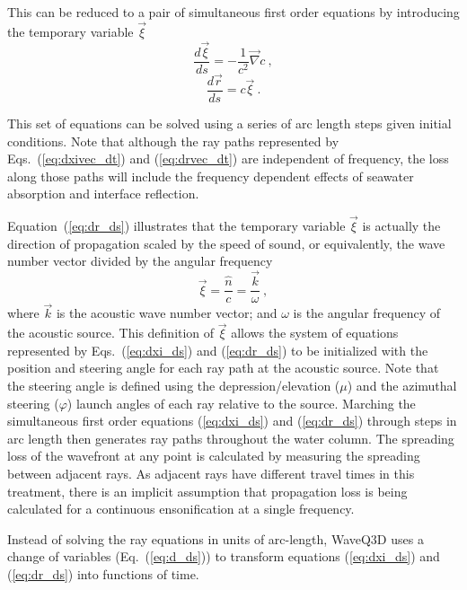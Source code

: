 \documentclass{ws-jca}
\begin{document}
This can be reduced to a pair of simultaneous first order equations by
introducing the temporary variable \(\vec{\xi}\)
\begin{equation}
	\frac{d\vec{\xi}}{ds} = -\frac{1}{c^2} \vec{\nabla}c \:,
	\label{eq:dxi_ds}
\end{equation}
\begin{equation}
	\frac{d\vec{r}}{ds} = c \vec{\xi} \:.
	\label{eq:dr_ds}
\end{equation}

This set of equations can be solved using a series of arc length steps
given initial conditions.\cite{Yakowitz1986,Press1992}
Note that although
the ray paths represented by Eqs.~(\ref{eq:dxivec_dt}) and
(\ref{eq:drvec_dt}) are independent of frequency, the loss along those
paths will include the frequency dependent effects of seawater absorption
and interface reflection.

Equation~(\ref{eq:dr_ds}) illustrates that the temporary variable
\(\vec{\xi}\) is actually the direction of propagation scaled by the speed
of sound, or equivalently, the wave number vector divided by the angular
frequency
\begin{equation}
	\vec{\xi} = \frac{\hat{n}}{c} = \frac{\vec{k}}{\omega} \:,
	\label{eq:n_c}
\end{equation}
where 
\(\vec{k}\) is the acoustic wave number vector; and
\(\omega\) is the angular frequency of the acoustic source.
This definition of \(\vec{\xi}\) allows the system of equations represented
by Eqs.~(\ref{eq:dxi_ds}) and (\ref{eq:dr_ds}) to be initialized with the
position and steering angle for each ray path at the acoustic source.
Note that the steering angle is defined using the depression/elevation (\(\mu\)) and the azimuthal steering (\(\varphi\)) launch angles of each ray relative to the source.  
Marching the simultaneous first order equations (\ref{eq:dxi_ds}) and (\ref{eq:dr_ds}) through steps in arc length then
generates ray paths throughout the water column. The spreading loss of the
wavefront at any point is calculated by measuring the spreading between
adjacent rays. As adjacent rays have different travel times in this
treatment, there is an implicit assumption that propagation loss is being
calculated for a continuous ensonification at a single frequency.

Instead of solving the ray equations in units of arc-length, WaveQ3D uses a change of variables (Eq.~(\ref{eq:d_ds})) to transform equations (\ref{eq:dxi_ds}) and (\ref{eq:dr_ds}) into functions of time.
\end{document}

